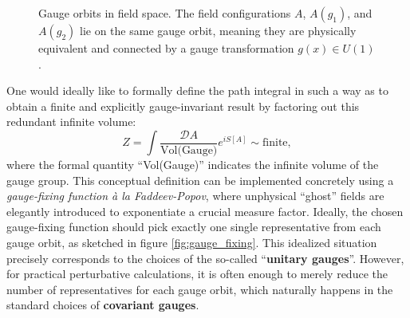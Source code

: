 \begin{figure}[H]
    \begin{minipage}{0.6\textwidth}
        \centering
    \end{minipage}
    \hfill
    \begin{minipage}{0.35\textwidth}
        \caption{Gauge orbits in field space. The field configurations $A$, $A(g_1)$, and $A(g_2)$ lie on the same gauge orbit, meaning they are physically equivalent and connected by a gauge transformation $g(x) \in U(1)$.}
        \label{fig:gauge_orbits}
    \end{minipage}
\end{figure}

One would ideally like to formally define the path integral in such a way as to obtain a finite and explicitly gauge-invariant result by factoring out this redundant infinite volume:
\begin{equation} \label{eq:finite_path_integral}
    Z = \int \frac{\mathcal{D}A}{\text{Vol(Gauge)}} e^{iS[A]} \sim \text{finite},
\end{equation}
where the formal quantity ``Vol(Gauge)'' indicates the infinite volume of the gauge group. This conceptual definition can be implemented concretely using a \textit{gauge-fixing function \`a la Faddeev-Popov}, where unphysical ``ghost'' fields are elegantly introduced to exponentiate a crucial measure factor. Ideally, the chosen gauge-fixing function should pick exactly one single representative from each gauge orbit, as sketched in figure \ref{fig:gauge_fixing}. This idealized situation precisely corresponds to the choices of the so-called ``\textbf{unitary gauges}''. However, for practical perturbative calculations, it is often enough to merely reduce the number of representatives for each gauge orbit, which naturally happens in the standard choices of \textbf{covariant gauges}.

